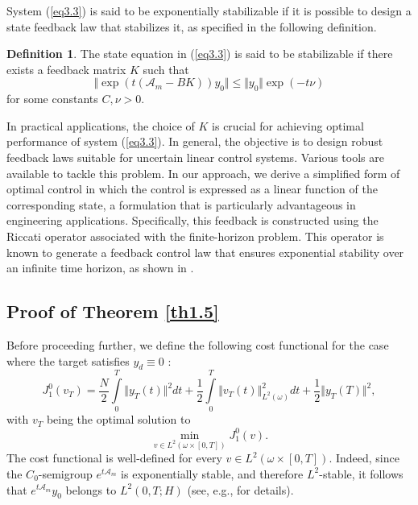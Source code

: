 \documentclass[10pt, a4]{amsart}
\newcounter{assu}
\theoremstyle{plain}
\theoremstyle{definition}
\newtheorem{definition}[lemma]{Definition}
\theoremstyle{remark}
\numberwithin{equation}{section}
\begin{document}
System (\ref{eq3.3}) is said to be exponentially stabilizable if it is possible to design a state feedback law that stabilizes it, as specified in the following definition.
\begin{definition}\label{de3.3}
The state equation in (\ref{eq3.3}) is said to be stabilizable if there exists a feedback matrix \(K\) such that
\[
\Vert \exp(t(\mathcal{A}_m - BK)) y_0 \Vert \leq \Vert y_0 \Vert \exp(-t\nu)
\]
for some constants \(C,\nu > 0\).
\end{definition}

In practical applications, the choice of $K$ is crucial for achieving optimal performance of system (\ref{eq3.3}). In general, the objective is to design robust feedback laws suitable for uncertain linear control systems. Various tools are available to tackle this problem. In our approach, we derive a simplified form of optimal control in which the control is expressed as a linear function of the corresponding state, a formulation that is particularly advantageous in engineering applications. Specifically, this feedback is constructed using the Riccati operator associated with the finite-horizon problem. This operator is known to generate a feedback control law that ensures exponential stability over an infinite time horizon, as shown in \cite{ref32}.
 \subsection{Proof of  Theorem \ref{th1.5}}

Before proceeding further, we define the following cost functional for the case where the target satisfies \(y_d\equiv 0\) :
 \begin{equation}\label{eq3.11}
J_1^0(v_T)=\dfrac{N}{2}\int\limits_{0}^{T}\Vert y_T(t)\Vert^2dt+\dfrac{1}{2}\int\limits_{0}^{T}\Vert v_T(t)\Vert_{L^2(\omega)}^2dt+\dfrac{1}{2}\Vert y_T(T)\Vert^2,
\end{equation} 
with \(v_T\) being the optimal solution to
\begin{equation}\label{eq3.12}
    \min\limits_{v\in L^2(\omega\times[0,T])}J_1^0(v).
\end{equation}
The cost functional is well-defined for every $v\in L^2(\omega\times[0,T])$. Indeed, since the $C_0$-semigroup $e^{t\mathcal{A}_m}$ is exponentially stable, and therefore $L^2$-stable, it follows that $e^{t\mathcal{A}_m}y_0$ belongs to $L^2(0,T;H)$ (see, e.g., \cite{ref59} for details).
\end{document}

